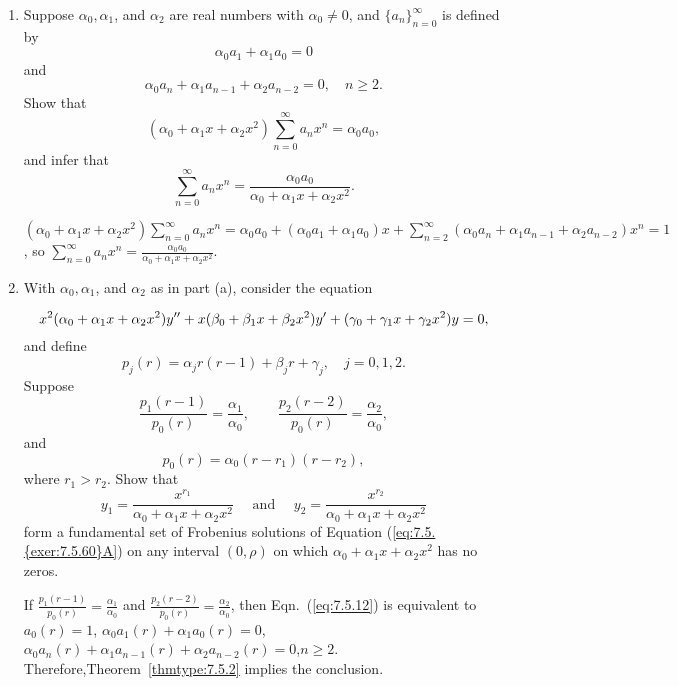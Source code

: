 \documentclass{ximera}
\begin{document}
\begin{problem}\label{exer:7.5.60}
\begin{enumerate}
\item %
Suppose $\alpha_0,\alpha_1$, and $\alpha_2$ are real numbers with
$\alpha_0\ne0$, and  $\{a_n\}_{n=0}^\infty$ is
defined by
$$
\alpha_0a_1+\alpha_1a_0=0
$$
and
$$
\alpha_0a_n+\alpha_1a_{n-1}+\alpha_2a_{n-2}=0,\quad n\geq 2.
$$
Show that
$$
(\alpha_0+\alpha_1x+\alpha_2x^2)\sum_{n=0}^\infty a_nx^n=\alpha_0a_0,
$$
and infer that
$$
\sum_{n=0}^\infty
a_nx^n=\frac{\alpha_0a_0}{\alpha_0+\alpha_1x+\alpha_2x^2}.
$$

\begin{solution}
    $(\alpha_0+\alpha_1x+\alpha_2x^2)\sum_{n=0}^\infty a_nx^n=
\alpha_0a_0+ (\alpha_0a_1+\alpha_1a_0)x+
\sum_{n=2}^\infty(\alpha_0a_n+\alpha_1a_{n-1}+\alpha_2a_{n-2})x^n=1$,
so $\sum_{n=0}^\infty
a_nx^n=\frac{\alpha_0a_0}{\alpha_0+\alpha_1x+\alpha_2x^2}$.
\end{solution}

\item %
With $\alpha_0,\alpha_1$, and $\alpha_2$ as in part (a), consider the
equation

\begin{equation} \label{eq:7.5.{exer:7.5.60}A}
x^2(\alpha_0+\alpha_1x+\alpha_2 x^2)y''+x(\beta_0+\beta_1x+\beta_2x^2)y'+
(\gamma_0+\gamma_1x+\gamma_2x^2)y=0,
\end{equation}
and define
$$
p_j(r)=\alpha_jr(r-1)+\beta_jr+\gamma_j,\quad j=0,1,2.
$$
Suppose
$$
\frac{p_1(r-1)}{p_0(r)}=
\frac{\alpha_1}{\alpha_0},\qquad
\frac{p_2(r-2)}{p_0(r)}=
\frac{\alpha_2}{\alpha_0},
$$
and
$$
p_0(r)=\alpha_0(r-r_1)(r-r_2),
$$
where $r_1>r_2$.  Show that
$$
y_1=\frac{x^{r_1}}{\alpha_0+\alpha_1x+\alpha_2x^2}\quad\mbox{ and }\quad
y_2=\frac{x^{r_2}}{\alpha_0+\alpha_1x+\alpha_2x^2}
$$
form a fundamental set of  Frobenius  solutions of Equation 
(\ref{eq:7.5.{exer:7.5.60}A}) on any interval $(0,\rho)$ on which
$\alpha_0+\alpha_1x+\alpha_2x^2$ has no zeros.

\begin{solution}
    If
$\frac{p_1(r-1)}{ p_0(r)}=
\frac{\alpha_1}{\alpha_0}$ and
$\frac{p_2(r-2)}{ p_0(r)}=
\frac{\alpha_2}{\alpha_0}$, then Eqn.~(\ref{eq:7.5.12}) is equivalent to
$a_0(r)=1$, $\alpha_0a_1(r)+\alpha_1a_0(r)=0$, $\alpha_0a_n(r)
+\alpha_1a_{n-1}(r)+\alpha_2a_{n-2}(r)=0$,\quad  $n\geq 2$.
Therefore,Theorem~\ref{thmtype:7.5.2} implies the conclusion.
\end{solution}
\end{enumerate}
\end{problem}
\end{document}
